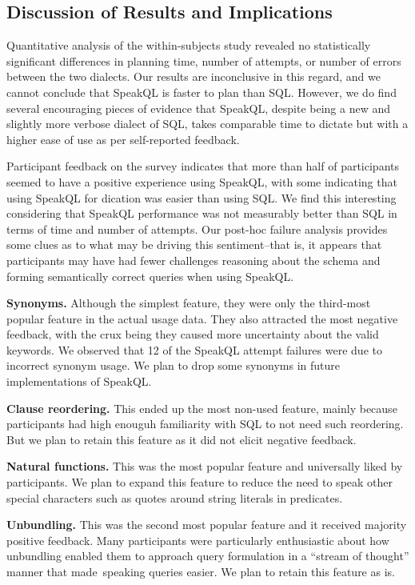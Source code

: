 \subsection{Discussion of Results and Implications}

Quantitative analysis of the within-subjects study revealed no statistically significant differences in planning time, number of attempts, or number of errors between the two dialects. Our results are inconclusive in this regard, and we cannot conclude that SpeakQL is faster to plan than SQL. However, we do find several encouraging pieces of evidence that SpeakQL, despite being a new and slightly more verbose dialect of SQL, takes comparable time to dictate but with a higher ease of use as per self-reported feedback. 

Participant feedback on the survey indicates that more than half of participants seemed to have a positive experience using SpeakQL, with some indicating that using SpeakQL for dication was easier than using SQL. We find this interesting considering that SpeakQL performance was not measurably better than SQL in terms of time and number of attempts. Our post-hoc failure analysis provides some clues as to what may be driving this sentiment--that is, it appears that participants may have had fewer challenges reasoning about the schema and forming semantically correct queries when using SpeakQL.


\textbf{Synonyms.} Although the simplest feature, they were only the third-most popular feature in the actual usage data. They also attracted the most negative feedback, with the crux being they caused more uncertainty about the valid keywords. We observed that 12 of the SpeakQL attempt failures were due to incorrect synonym usage. We plan to drop some synonyms in future implementations of SpeakQL. 

\textbf{Clause reordering.} This ended up the most non-used feature, mainly because participants had high enouguh familiarity with SQL to not need such reordering. But we plan to retain this feature as it did not elicit negative feedback.

\textbf{Natural functions.} This was the most popular feature and universally liked by participants. We plan to expand this feature to reduce the need to speak other special characters such as quotes around string literals in predicates.

\textbf{Unbundling.} This was the second most popular feature and it received majority positive feedback. Many participants were particularly enthusiastic about how unbundling enabled them to approach query formulation in a ``stream of thought'' manner that made speaking queries easier. We plan to retain this feature as is.


